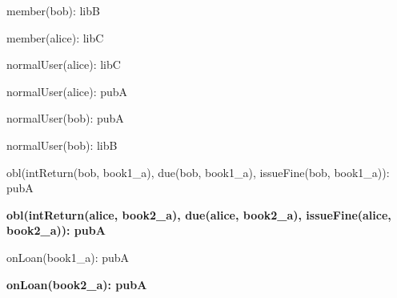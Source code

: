 \documentclass{article}
\begin{document}
{\begin{minipage}{\tableWidth}
\begin{description}[align=left,leftmargin=1em,noitemsep,labelsep=\parindent]
\item{{member(\allowbreak{}bob): libB}}
\item{{member(\allowbreak{}alice): libC}}
\item{{normalUser(\allowbreak{}alice): libC}}
\item{{normalUser(\allowbreak{}alice): pubA}}
\item{{normalUser(\allowbreak{}bob): pubA}}
\item{{normalUser(\allowbreak{}bob): libB}}
\item{{obl(\allowbreak{}intReturn(\allowbreak{}bob, book1\_a), due(\allowbreak{}bob, book1\_a), issueFine(\allowbreak{}bob, book1\_a)): pubA}}
\item\textbf{{obl(\allowbreak{}intReturn(\allowbreak{}alice, book2\_a), due(\allowbreak{}alice, book2\_a), issueFine(\allowbreak{}alice, book2\_a)): pubA}}
\item{{onLoan(\allowbreak{}book1\_a): pubA}}
\item\textbf{{onLoan(\allowbreak{}book2\_a): pubA}}
\end{description}\end{minipage}}
\end{document}
